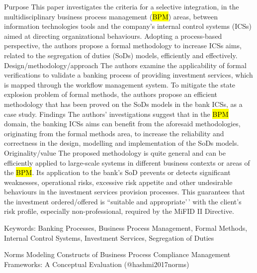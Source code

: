\documentclass[
  letterpaper,
  DIV=11,
  numbers=noendperiod]{scrartcl}
\begin{document}
Purpose This paper investigates the criteria for a selective
integration, in the multidisciplinary business process management
(\hl{BPM}) areas, between information technologies tools and the
company's internal control systems (ICSs) aimed at directing
organizational behaviours. Adopting a process-based perspective, the
authors propose a formal methodology to increase ICSs aims, related to
the segregation of duties (SoDs) models, efficiently and effectively.
Design/methodology/approach The authors examine the applicability of
formal verifications to validate a banking process of providing
investment services, which is mapped through the workflow management
system. To mitigate the state explosion problem of formal methods, the
authors propose an efficient methodology that has been proved on the
SoDs models in the bank ICSs, as a case study. Findings The authors'
investigations suggest that in the \hl{BPM} domain, the banking ICSs
aims can benefit from the aforesaid methodologies, originating from the
formal methods area, to increase the reliability and correctness in the
design, modelling and implementation of the SoDs models.
Originality/value The proposed methodology is quite general and can be
efficiently applied to large-scale systems in different business
contexts or areas of the \hl{BPM}. Its application to the bank's SoD
prevents or detects significant weaknesses, operational risks, excessive
risk appetite and other undesirable behaviours in the investment
services provision processes. This guarantees that the investment
ordered/offered is ``suitable and appropriate'\,' with the client's risk
profile, especially non-professional, required by the MiFID II
Directive.

Keywords: Banking Processes, Business Process Management, Formal
Methods, Internal Control Systems, Investment Services, Segregation of
Duties

Norms Modeling Constructs of Business Process Compliance Management
Frameworks: A Conceptual Evaluation (@hashmi2017norms)
\end{document}
